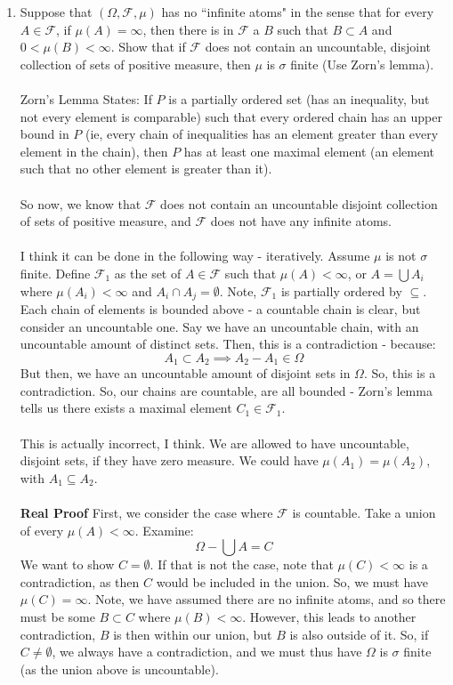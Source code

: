 \documentclass[12pt,a4paper]{article}
\newcommand{\1}[1]{\mathbbm{1}\left\{ #1 \right\}}
\newcommand{\fcal}{\mathcal{F}}
\begin{document}
\begin{enumerate}
	\item Suppose that $(\Omega, \fcal, \mu)$ has no ``infinite atoms" in the sense that for every $A \in \fcal$, if $\mu(A) = \infty$, then there is in $\fcal$ a $B$ such that $B \subset A$ and $0 < \mu(B) < \infty$. Show that if $\fcal$ does not contain an uncountable, disjoint collection of sets of positive measure, then $\mu$ is $\sigma$ finite (Use Zorn's lemma).
	\\\\
	Zorn's Lemma States: If $P$ is a partially ordered set (has an inequality, but not every element is comparable) such that every ordered chain has an upper bound in $P$ (ie, every chain of inequalities has an element greater than every element in the chain), then $P$ has at least one maximal element (an element such that no other element is greater than it).
	\\\\
	So now, we know that $\fcal$ does not contain an uncountable disjoint collection of sets of positive measure, and $\fcal$ does not have any infinite atoms.
	\\\\
	I think it can be done in the following way - iteratively. Assume $\mu$ is not $\sigma$ finite. Define $\fcal_1$ as the set of $A \in \fcal$ such that $\mu(A) < \infty$, or $A = \bigcup A_i$ where $\mu(A_i) < \infty$ and $A_i \cap A_j = \emptyset$. Note, $\fcal_1$ is partially ordered by $\subseteq$. Each chain of elements is bounded above - a countable chain is clear, but consider an uncountable one. Say we have an uncountable chain, with an uncountable amount of distinct sets. Then, this is a contradiction - because:
	$$
		A_1 \subset A_2 \implies A_2 - A_1 \in \Omega
	$$
	But then, we have an uncountable amount of disjoint sets in $\Omega$. So, this is a contradiction. So, our chains are countable, are all bounded - Zorn's lemma tells us there exists a maximal element $C_1 \in \fcal_1$.
	\\\\
	This is actually incorrect, I think. We are allowed to have uncountable, disjoint sets, if they have zero measure. We could have $\mu(A_1) = \mu(A_2)$, with $A_1 \subseteq A_2$.
	\\\\
	\textbf{Real Proof} First, we consider the case where $\fcal$ is countable. Take a union of every $\mu(A) < \infty$. Examine:
	$$
		\Omega - \bigcup A = C
	$$
	We want to show $C = \emptyset$. If that is not the case, note that $\mu(C) < \infty$ is a contradiction, as then $C$ would be included in the union. So, we must have $\mu(C) = \infty$. Note, we have assumed there are no infinite atoms, and so there must be some $B \subset C$ where $\mu(B) < \infty$. However, this leads to another contradiction, $B$ is then within our union, but $B$ is also outside of it. So, if $C \neq \emptyset$, we always have a contradiction, and we must thus have $\Omega$ is $\sigma$ finite (as the union above is uncountable).

\end{enumerate}
\end{document}

